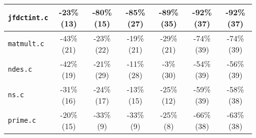 \begin{tabular}{ |l| |c|c|c|c| |c|c| }
  \\\hline
      \verb|jfdctint.c|
    & -23\% (13) & -80\% (15) & -85\% (27) & -89\% (35)
    & -92\% (37) & -92\% (37) 
      
  \\\hline
      \verb|matmult.c|
    & -43\% (21) & -23\% (22) & -19\% (21) & -29\% (21)
    & -74\% (39) & -74\% (39) 
      
  \\\hline
      \verb|ndes.c|
    & -42\% (19) & -21\% (29) & -11\% (28) & -3\% (30)  
    & -54\% (39) & -56\% (39) 
      
  \\\hline
      \verb|ns.c|
    & -31\% (16) & -24\% (17) & -13\% (15) & -25\% (12)  
    & -59\% (39) & -58\% (38) 
      
  \\\hline
      \verb|prime.c|
    & -20\% (15) & -33\% (9) & -33\% (9) & -25\% (8)   
    & -66\% (38) & -63\% (38) 
      
  \\\hline
\end{tabular}
